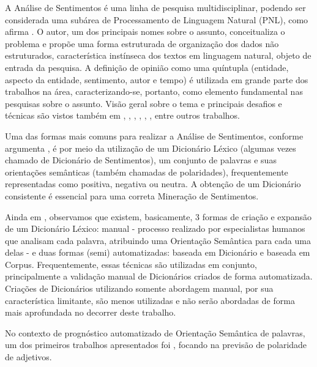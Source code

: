 \documentclass[a4paper,11pt]{article}
\begin{document}
A Análise de Sentimentos é uma linha de pesquisa multidisciplinar, podendo ser considerada uma subárea de Processamento de Linguagem Natural (PNL), como afirma \cite{liu2010multifaceted}. O autor, um dos principais nomes sobre o assunto, conceitualiza o problema e propõe uma forma estruturada de organização dos dados não estruturados, característica instínseca dos textos em linguagem natural, objeto de entrada da pesquisa. A definição de opinião como uma quíntupla (entidade, aspecto da entidade, sentimento, autor e tempo) é utilizada em grande parte dos trabalhos na área, caracterizando-se, portanto, como elemento fundamental nas pesquisas sobre o assunto. Visão geral sobre o tema e principais desafios e técnicas são vistos também em \cite{mohammad2016challenges}, \cite{ghaleb2016survey}, \cite{kdir16}, \cite{taboada2011lexicon}, \cite{bandhakavi2016lexicon}, \cite{Alessia}, entre outros trabalhos.

Uma das formas mais comuns para realizar a Análise de Sentimentos, conforme argumenta \cite{kdir16}, é por meio da utilização de um Dicionário Léxico (algumas vezes chamado de Dicionário de Sentimentos), um conjunto de palavras e suas orientações semânticas (também chamadas de polaridades), frequentemente representadas como positiva, negativa ou neutra. A obtenção de um Dicionário consistente é essencial para uma correta Mineração de Sentimentos. 

Ainda em \cite{kdir16}, observamos que existem, basicamente, 3 formas de criação e expansão de um Dicionário Léxico: manual -  processo realizado por especialistas humanos que analisam cada palavra, atribuindo uma Orientação Semântica para cada uma delas -  e duas formas (semi) automatizadas: baseada em Dicionário e baseada em Corpus. Frequentemente, essas técnicas são utilizadas em conjunto, principalmente a validação manual de Dicionários criados de forma automatizada. Criações de Dicionários utilizando somente abordagem manual, por sua característica limitante, são menos utilizadas e não serão abordadas de forma mais aprofundada no decorrer deste trabalho.

No contexto de prognóstico automatizado de Orientação Semântica de palavras, um dos primeiros trabalhos apresentados foi \cite{Hatzivassiloglou}, focando na previsão de polaridade de adjetivos.
\end{document}
